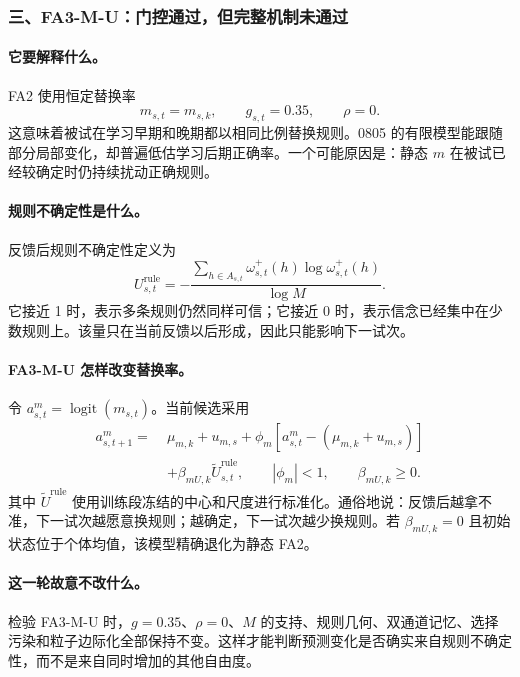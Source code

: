 \subsubsection{三、FA3-M-U：门控通过，但完整机制未通过}

\paragraph{它要解释什么。}
FA2 使用恒定替换率
\begin{equation}
m_{s,t}=m_{s,k},
\qquad g_{s,t}=0.35,
\qquad \rho=0.
\label{eq:model0806-fa2-static}
\end{equation}
这意味着被试在学习早期和晚期都以相同比例替换规则。0805 的有限模型能跟随部分局部变化，却普遍低估学习后期正确率。一个可能原因是：静态 $m$ 在被试已经较确定时仍持续扰动正确规则。

\paragraph{规则不确定性是什么。}
反馈后规则不确定性定义为
\begin{equation}
U^{\mathrm{rule}}_{s,t}
=-\frac{\sum_{h\in A_{s,t}}
\omega^+_{s,t}(h)\log\omega^+_{s,t}(h)}{\log M}.
\label{eq:model0806-rule-uncertainty}
\end{equation}
它接近 1 时，表示多条规则仍然同样可信；它接近 0 时，表示信念已经集中在少数规则上。该量只在当前反馈以后形成，因此只能影响下一试次。

\paragraph{FA3-M-U 怎样改变替换率。}
令 $a^m_{s,t}=\operatorname{logit}(m_{s,t})$。当前候选采用
\begin{align}
a^m_{s,t+1}
=\;&\mu_{m,k}+u_{m,s}
+\phi_m\!\left[a^m_{s,t}-(\mu_{m,k}+u_{m,s})\right]\nonumber\\
&+\beta_{mU,k}\widetilde U^{\mathrm{rule}}_{s,t},
\qquad |\phi_m|<1,
\qquad \beta_{mU,k}\geq0.
\label{eq:model0806-dynamic-m-u}
\end{align}
其中 $\widetilde U^{\mathrm{rule}}$ 使用训练段冻结的中心和尺度进行标准化。通俗地说：反馈后越拿不准，下一试次越愿意换规则；越确定，下一试次越少换规则。若 $\beta_{mU,k}=0$ 且初始状态位于个体均值，该模型精确退化为静态 FA2。

\paragraph{这一轮故意不改什么。}
检验 FA3-M-U 时，$g=0.35$、$\rho=0$、$M$ 的支持、规则几何、双通道记忆、选择污染和粒子边际化全部保持不变。这样才能判断预测变化是否确实来自规则不确定性，而不是来自同时增加的其他自由度。

